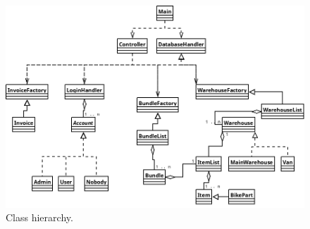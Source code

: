 \documentclass{report}
\begin{document}
\begin{figure}
  \centering
    \includegraphics[width=\textwidth,height=\textheight,keepaspectratio]{../diagrams/image_versions/overview.png}
    \caption{Class hierarchy.}
\end{figure}




\listoffigures

\listoftables
\end{document}
